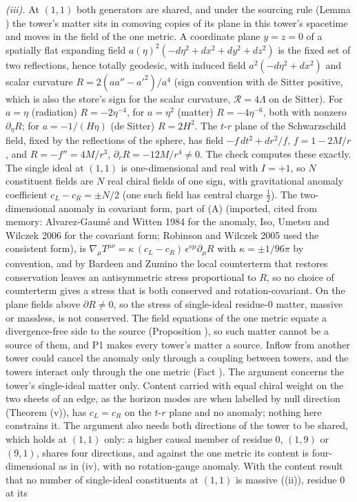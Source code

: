 \emph{(iii).} At $(1,1)$ both generators are shared, and under the sourcing rule (Lemma ) the tower's matter sits in comoving copies of its plane in this tower's spacetime and moves in the field of the one metric. A coordinate plane $y = z = 0$ of a spatially flat expanding field $a(\eta)^{2}(-d\eta^{2} + dx^{2} + dy^{2} + dz^{2})$ is the fixed set of two reflections, hence totally geodesic, with induced field $a^{2}(-d\eta^{2} + dx^{2})$ and scalar curvature $R = 2(aa'' - a'^{2})/a^{4}$ (sign convention with de Sitter positive, which is also the store's sign for the scalar curvature, $\mathcal{R} = 4\Lambda$ on de Sitter). For $a = \eta$ (radiation) $R = -2\eta^{-4}$, for $a = \eta^{2}$ (matter) $R = -4\eta^{-6}$, both with nonzero $\partial_{\eta}R$; for $a = -1/(H\eta)$ (de Sitter) $R = 2H^{2}$. The $t$-$r$ plane of the Schwarzschild field, fixed by the reflections of the sphere, has field $-f\,dt^{2} + dr^{2}/f$, $f = 1 - 2M/r$, and $R = -f'' = 4M/r^{3}$, $\partial_{r}R = -12M/r^{4} \ne 0$. The check computes these exactly. The single ideal at $(1,1)$ is one-dimensional and real with $I = +1$, so $N$ constituent fields are $N$ real chiral fields of one sign, with gravitational anomaly coefficient $c_{L} - c_{R} = \pm N/2$ (one such field has central charge $\tfrac12$). The two-dimensional anomaly in covariant form, part of (A) (imported, cited from memory: Alvarez-Gaum\'e and Witten 1984 for the anomaly, Iso, Umetsu and Wilczek 2006 for the covariant form; Robinson and Wilczek 2005 used the consistent form), is $\nabla_{\mu}T^{\mu\nu} = \kappa\,(c_{L} - c_{R})\,\epsilon^{\nu\mu}\partial_{\mu}R$ with $\kappa = \pm 1/96\pi$ by convention, and by Bardeen and Zumino the local counterterm that restores conservation leaves an antisymmetric stress proportional to $R$, so no choice of counterterm gives a stress that is both conserved and rotation-covariant. On the plane fields above $\partial R \ne 0$, so the stress of single-ideal residue-$0$ matter, massive or massless, is not conserved. The field equations of the one metric equate a divergence-free side to the source (Proposition ), so such matter cannot be a source of them, and P1 makes every tower's matter a source. Inflow from another tower could cancel the anomaly only through a coupling between towers, and the towers interact only through the one metric (Fact ). The argument concerns the tower's single-ideal matter only. Content carried with equal chiral weight on the two sheets of an edge, as the horizon modes are when labelled by null direction (Theorem (v)), has $c_{L} = c_{R}$ on the $t$-$r$ plane and no anomaly; nothing here constrains it. The argument also needs both directions of the tower to be shared, which holds at $(1,1)$ only: a higher causal member of residue $0$, $(1,9)$ or $(9,1)$, shares four directions, and against the one metric its content is four-dimensional as in (iv), with no rotation-gauge anomaly. With the content result that no number of single-ideal constituents at $(1,1)$ is massive ((ii)), residue $0$ at its 